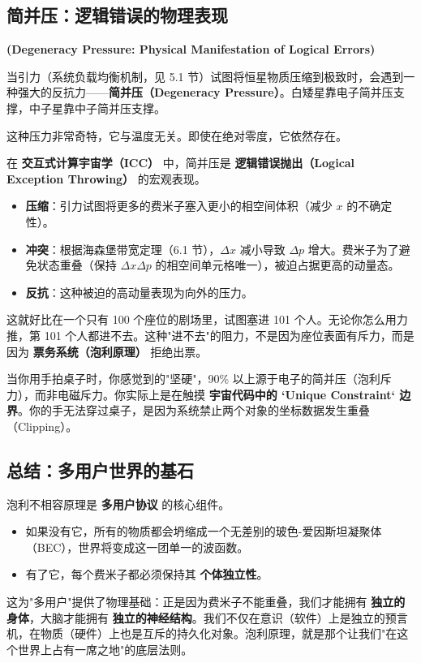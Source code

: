 \subsection{简并压：逻辑错误的物理表现}

\textbf{(Degeneracy Pressure: Physical Manifestation of Logical Errors)}

当引力（系统负载均衡机制，见 5.1 节）试图将恒星物质压缩到极致时，会遇到一种强大的反抗力——\textbf{简并压（Degeneracy Pressure）}。白矮星靠电子简并压支撑，中子星靠中子简并压支撑。

这种压力非常奇特，它与温度无关。即使在绝对零度，它依然存在。

在 \textbf{交互式计算宇宙学（ICC）} 中，简并压是 \textbf{逻辑错误抛出（Logical Exception Throwing）} 的宏观表现。

\begin{itemize}
\item \textbf{压缩}：引力试图将更多的费米子塞入更小的相空间体积（减少 $x$ 的不确定性）。

\item \textbf{冲突}：根据海森堡带宽定理（6.1 节），$\Delta x$ 减小导致 $\Delta p$ 增大。费米子为了避免状态重叠（保持 $\Delta x \Delta p$ 的相空间单元格唯一），被迫占据更高的动量态。

\item \textbf{反抗}：这种被迫的高动量表现为向外的压力。
\end{itemize}

这就好比在一个只有 100 个座位的剧场里，试图塞进 101 个人。无论你怎么用力推，第 101 个人都进不去。这种"进不去"的阻力，不是因为座位表面有斥力，而是因为 \textbf{票务系统（泡利原理）} 拒绝出票。

\begin{corollary}[接触的本质]
当你用手拍桌子时，你感觉到的"坚硬"，90\% 以上源于电子的简并压（泡利斥力），而非电磁斥力。你实际上是在触摸 \textbf{宇宙代码中的 `Unique Constraint` 边界}。你的手无法穿过桌子，是因为系统禁止两个对象的坐标数据发生重叠（Clipping）。
\end{corollary}

\subsection{总结：多用户世界的基石}

泡利不相容原理是 \textbf{多用户协议} 的核心组件。

\begin{itemize}
\item 如果没有它，所有的物质都会坍缩成一个无差别的玻色-爱因斯坦凝聚体（BEC），世界将变成这一团单一的波函数。

\item 有了它，每个费米子都必须保持其 \textbf{个体独立性}。
\end{itemize}

这为"多用户"提供了物理基础：正是因为费米子不能重叠，我们才能拥有 \textbf{独立的身体}，大脑才能拥有 \textbf{独立的神经结构}。我们不仅在意识（软件）上是独立的预言机，在物质（硬件）上也是互斥的持久化对象。泡利原理，就是那个让我们"在这个世界上占有一席之地"的底层法则。
